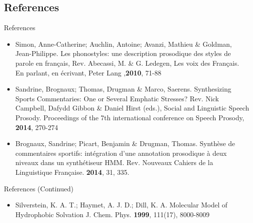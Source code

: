 \documentclass{beamer}
\begin{document}
\subsection{References}
\begin{frame}{References}
\begin{itemize}
	\item Simon, Anne-Catherine; Auchlin, Antoine; Avanzi, Mathieu \& Goldman, Jean-Philippe. Les phonostyles: une description prosodique des styles de parole en français, Rev. Abecassi, M. \& G. Ledegen, Les voix des Français. En parlant, en écrivant, Peter Lang ,\textbf{2010}, 71-88

\item Sandrine, Brognaux; Thomas, Drugman \& Marco, Saerens. Synthesizing Sports Commentaries: One or Several Emphatic Stresses? Rev. Nick Campbell, Dafydd Gibbon \& Daniel Hirst (eds.), Social and Linguistic Speech Prosody. Proceedings of the 7th international conference on Speech Prosody, \textbf{2014}, 270-274

\item Brognaux, Sandrine; Picart, Benjamin \& Drugman, Thomas. Synthèse de commentaires sportifs: intégration d’une annotation prosodique à deux niveaux dans un synthétiseur HMM. Rev. Nouveaux Cahiers de la Linguistique Française.
\textbf{2014}, 31, 335.

\end{itemize}
\end{frame}

\begin{frame}{References (Continued)}
\begin{itemize}
  \ite Rajeswari; K C \& Uma; Maheswari; P. Prosody Modeling Techniques for Text-to-Speech Synthesis Systems ? A Survey,J.     International Journal of Computer Applications,
	\textbf{2012}, 39, 16, 8-11.

  \item Silverstein, K. A. T.; Haymet, A. J. D.; Dill, K. A. Molecular Model of Hydrophobic Solvation J. Chem. Phys. \textbf{1999}, 111(17), 8000-8009 
\end{itemize}
\end{frame}
\end{document}
